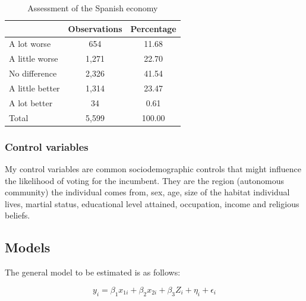 \documentclass[a4paper, svgnames]{article}
\begin{document}
\begin{table}[H]
	\centering
	\caption{Assessment of the Spanish economy}
	\label{tab:economic assessment}
	\begin{tabular}{@{}lcc@{}}
		\toprule
		                & Observations & Percentage \\ \midrule
		A lot worse     & 654          & 11.68      \\
		A little worse  & 1,271        & 22.70      \\
		No difference   & 2,326        & 41.54      \\
		A little better & 1,314        & 23.47      \\
		A lot better    & 34           & 0.61       \\
		Total           & 5,599        & 100.00     \\ \bottomrule
	\end{tabular}
\end{table}

\subsubsection{Control variables}
My control variables are common sociodemographic controls that might influence the likelihood of voting for the incumbent. They are the region (autonomous community) the individual comes from, sex, age, size of the habitat individual lives, martial status, educational level attained, occupation, income and religious beliefs.

\subsection{Models}

The general model to be estimated is as follows:

\begin{equation}
	\label{model}
	y_i = \beta_1 x_{1i} + \beta_2 x_{2i} + \beta_3 Z_i  + \eta_i  + \epsilon_i
\end{equation}
\end{document}
